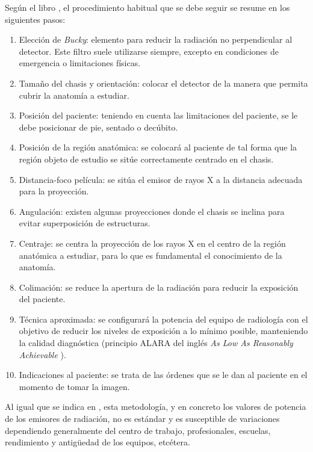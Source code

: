 Según el libro \cite{manualpractico}, el procedimiento habitual que se debe seguir se resume en los siguientes pasos:
\begin{enumerate}
    \item Elección de \emph{Bucky}: elemento para reducir la radiación no perpendicular al detector. Este filtro suele utilizarse siempre, excepto en condiciones de emergencia o limitaciones físicas.
    \item Tamaño del chasis y orientación: colocar el detector de la manera que permita cubrir la anatomía a estudiar.
    \item Posición del paciente: teniendo en cuenta las limitaciones del paciente, se le debe posicionar de pie, sentado o decúbito.
    \item Posición de la región anatómica: 
    se colocará al paciente de tal forma que la región objeto de estudio se sitúe correctamente centrado en el chasis.
    \item Distancia-foco película: se sitúa el emisor de rayos X a la distancia adecuada para la proyección.
    \item Angulación: existen algunas proyecciones donde el chasis se inclina para evitar superposición de estructuras.
    \item Centraje: se centra la proyección de los rayos X en el centro de la región anatómica a estudiar, para lo que es fundamental el conocimiento de la anatomía.
    \item Colimación: se reduce la apertura de la radiación para reducir la exposición del paciente.
    \item Técnica aproximada: se configurará la potencia del equipo de radiología con el objetivo de reducir los niveles de exposición a lo mínimo posible, manteniendo la calidad diagnóstica (principio ALARA del inglés \emph{As Low As Reasonably Achievable} \cite{manualpractico}). 
    \item Indicaciones al paciente: se trata de las órdenes que se le dan al paciente en el momento de tomar la imagen.
\end{enumerate}

Al igual que se indica en \cite{manualpractico}, esta metodología, y en concreto los valores de potencia de los emisores de radiación, no es estándar y es susceptible de variaciones dependiendo generalmente del centro de trabajo, profesionales, escuelas, rendimiento y antigüedad de los equipos, etcétera. 



